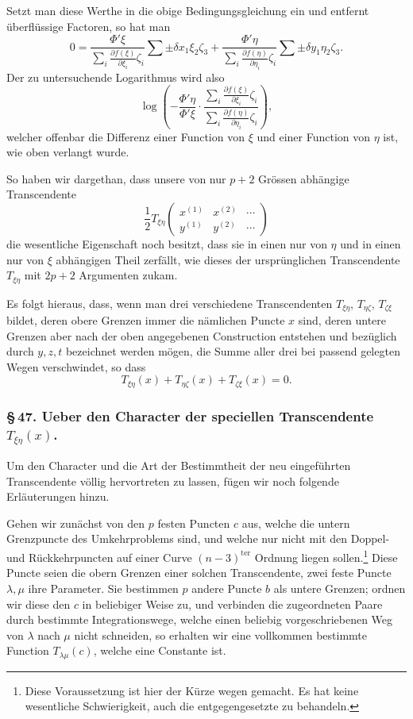 \documentclass[10pt]{article}
\begin{document}

Setzt man diese Werthe in die obige Bedingungsgleichung ein und entfernt überflüssige Factoren, so hat man
\[
0=\frac{\Phi'\xi}{\sum_i \frac{\partial f(\xi)}{\partial \xi_i}\zeta_i}
\sum\pm\delta x_1\xi_2\zeta_3
+\frac{\Phi'\eta}{\sum_i \frac{\partial f(\eta)}{\partial \eta_i}\zeta_i}
\sum\pm\delta y_1\eta_2\zeta_3 .
\]
Der zu untersuchende Logarithmus wird also
\[
\log\left(-\frac{\Phi'\eta}{\Phi'\xi}\cdot
\frac{\sum_i \frac{\partial f(\xi)}{\partial \xi_i}\zeta_i}
{\sum_i \frac{\partial f(\eta)}{\partial \eta_i}\zeta_i}\right),
\]
welcher offenbar die Differenz einer Function von \(\xi\) und einer Function von \(\eta\) ist, wie oben verlangt wurde.

So haben wir dargethan, dass unsere von nur \(p+2\) Grössen abhängige Transcendente
\[
\frac12 T_{\xi\eta}\begin{pmatrix}x^{(1)}&x^{(2)}&\cdots\\ y^{(1)}&y^{(2)}&\cdots\end{pmatrix}
\]
die wesentliche Eigenschaft noch besitzt, dass sie in einen nur von \(\eta\) und in einen nur von \(\xi\) abhängigen Theil zerfällt, wie dieses der ursprünglichen Transcendente \(T_{\xi\eta}\) mit \(2p+2\) Argumenten zukam.

Es folgt hieraus, dass, wenn man drei verschiedene Transcendenten \(T_{\xi\eta}\), \(T_{\eta\zeta}\), \(T_{\zeta\xi}\) bildet, deren obere Grenzen immer die nämlichen Puncte \(x\) sind, deren untere Grenzen aber nach der oben angegebenen Construction entstehen und bezüglich durch \(y,z,t\) bezeichnet werden mögen, die Summe aller drei bei passend gelegten Wegen verschwindet, so dass
\[
T_{\xi\eta}(x)+T_{\eta\zeta}(x)+T_{\zeta\xi}(x)=0.
\]

\subsubsection*{\S\,47. Ueber den Character der speciellen Transcendente \(T_{\xi\eta}(x)\).}

Um den Character und die Art der Bestimmtheit der neu eingeführten Transcendente völlig hervortreten zu lassen, fügen wir noch folgende Erläuterungen hinzu.

Gehen wir zunächst von den \(p\) festen Puncten \(c\) aus, welche die untern Grenzpuncte des Umkehrproblems sind, und welche nur nicht mit den Doppel- und Rückkehrpuncten auf einer Curve \((n-3)^{\mathrm{ter}}\) Ordnung liegen sollen.\footnote{Diese Voraussetzung ist hier der Kürze wegen gemacht. Es hat keine wesentliche Schwierigkeit, auch die entgegengesetzte zu behandeln.} Diese Puncte seien die obern Grenzen einer solchen Transcendente, zwei feste Puncte \(\lambda,\mu\) ihre Parameter. Sie bestimmen \(p\) andere Puncte \(b\) als untere Grenzen; ordnen wir diese den \(c\) in beliebiger Weise zu, und verbinden die zugeordneten Paare durch bestimmte Integrationswege, welche einen beliebig vorgeschriebenen Weg von \(\lambda\) nach \(\mu\) nicht schneiden, so erhalten wir eine vollkommen bestimmte Function \(T_{\lambda\mu}(c)\), welche eine Constante ist.
\end{document}
